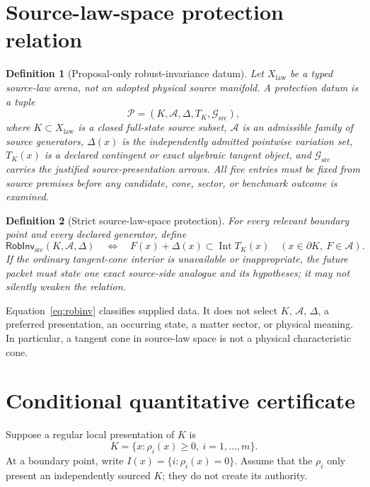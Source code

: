 \documentclass[11pt]{article}
\newtheorem{definition}{Definition}
\newcommand{\RobInv}{\mathsf{RobInv}_{\mathrm{src}}}
\begin{document}
\section{Source-law-space protection relation}

\begin{definition}[Proposal-only robust-invariance datum]
Let \(X_{\mathrm{law}}\) be a typed source-law arena, not an adopted physical
source manifold.  A protection datum is a tuple
\[
  \mathcal P=(K,\mathcal A,\Delta,T_K,\mathcal G_{\mathrm{src}}),
\]
where \(K\subset X_{\mathrm{law}}\) is a closed full-state source subset,
\(\mathcal A\) is an admissible family of source generators,
\(\Delta(x)\) is the independently admitted pointwise variation set,
\(T_K(x)\) is a declared contingent or exact algebraic tangent object, and
\(\mathcal G_{\mathrm{src}}\) carries the justified source-presentation
arrows.  All five entries must be fixed from source premises before any
candidate, cone, sector, or benchmark outcome is examined.
\end{definition}

\begin{definition}[Strict source-law-space protection]
For every relevant boundary point and every declared generator, define
\begin{equation}
 \RobInv(K,\mathcal A,\Delta)
 \quad\Longleftrightarrow\quad
 F(x)+\Delta(x)\subset \operatorname{Int}T_K(x)
 \quad
 (x\in\partial K,\ F\in\mathcal A).
 \label{eq:robinv}
\end{equation}
If the ordinary tangent-cone interior is unavailable or inappropriate, the
future packet must state one exact source-side analogue and its hypotheses;
it may not silently weaken the relation.
\end{definition}

Equation~\eqref{eq:robinv} classifies supplied data.  It does not select
\(K\), \(\mathcal A\), \(\Delta\), a preferred presentation, an occurring
state, a matter sector, or physical meaning.  In particular, a tangent cone
in source-law space is not a physical characteristic cone.

\section{Conditional quantitative certificate}

Suppose a regular local presentation of \(K\) is
\[
 K=\{x:\rho_i(x)\geq0,\ i=1,\dots,m\}.
\]
At a boundary point, write \(I(x)=\{i:\rho_i(x)=0\}\).  Assume that the
\(\rho_i\) only present an independently sourced \(K\); they do not create
its authority.
\end{document}
